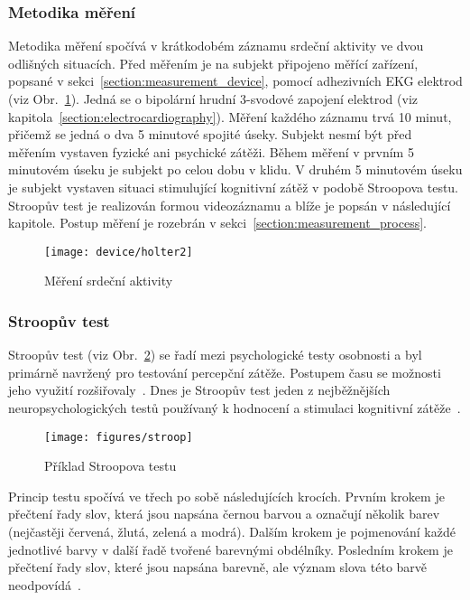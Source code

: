 \subsubsection{Metodika měření}
\label{section:measurement_methodology}
Metodika měření spočívá v krátkodobém záznamu srdeční aktivity ve dvou odlišných
situacích. Před měřením je na subjekt připojeno měřící zařízení, popsané v
sekci~\ref{section:measurement_device}, pomocí adhezivních EKG elektrod (viz
Obr.~\ref{fig:device_usage}). Jedná se o bipolární hrudní 3-svodové zapojení
elektrod (viz kapitola~\ref{section:electrocardiography}). Měření každého
záznamu trvá 10 minut, přičemž se jedná o dva 5 minutové spojité úseky. Subjekt
nesmí být před měřením vystaven fyzické ani psychické zátěži. Během měření v
prvním 5 minutovém úseku je subjekt po celou dobu v klidu. V druhém 5 minutovém
úseku je subjekt vystaven situaci stimulující kognitivní zátěž v podobě
Stroopova testu. Stroopův test je realizován formou videozáznamu a blíže je
popsán v následující kapitole. Postup měření je rozebrán v
sekci~\ref{section:measurement_process}.

\begin{figure}[h]
    \begin{center}
        \texttt{[image: device/holter2]}
        \caption{Měření srdeční aktivity}
        \label{fig:device_usage}
    \end{center}
\end{figure}

\subsubsection{Stroopův test}
\label{section:stroop_test}
Stroopův test (viz Obr.~\ref{fig:stroop}) se řadí mezi psychologické testy osobnosti a byl primárně navržený
pro testování percepční zátěže. Postupem času se možnosti jeho využití
rozšiřovaly~\cite{Svoboda1999}. Dnes je Stroopův test jeden z nejběžnějších
neuropsychologických testů používaný k hodnocení  a stimulaci kognitivní
zátěže~\cite{Scarpina2017}.

\begin{figure}[h]
    \begin{center}
        \texttt{[image: figures/stroop]}
        \caption{Příklad Stroopova testu~\cite{stroopWiki}}
        \label{fig:stroop}
    \end{center}
\end{figure}

Princip testu spočívá ve třech po sobě následujících krocích. Prvním krokem je
přečtení řady slov, která jsou napsána černou barvou a označují několik barev
(nejčastěji červená, žlutá, zelená a modrá). Dalším krokem je pojmenování každé
jednotlivé barvy v další řadě tvořené barevnými obdélníky. Posledním krokem je
přečtení řady slov, které jsou napsána barevně, ale význam slova této barvě
neodpovídá~\cite{Svoboda1999}.

